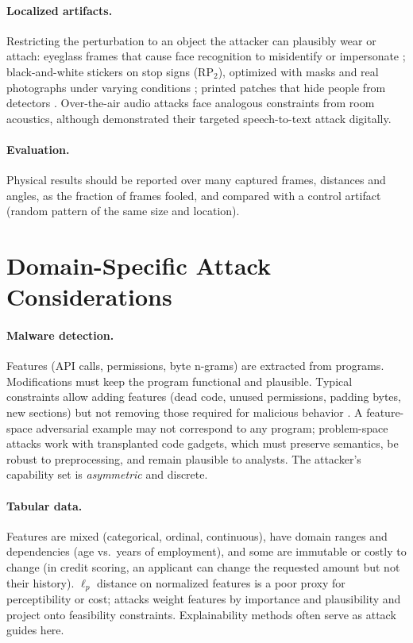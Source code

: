 \documentclass[10pt,a4paper]{extarticle}
\theoremstyle{definition}
\begin{document}
\paragraph{Localized artifacts.} Restricting the perturbation to an object the attacker can plausibly wear or attach: eyeglass frames that cause face recognition to misidentify or impersonate \citep{sharif2016accessorize}; black-and-white stickers on stop signs (RP\(_2\)), optimized with masks and real photographs under varying conditions \citep{eykholt2018robust}; printed patches that hide people from detectors \citep{thys2019fooling}. Over-the-air audio attacks face analogous constraints from room acoustics, although \citet{carlini2018audio} demonstrated their targeted speech-to-text attack digitally.

\paragraph{Evaluation.} Physical results should be reported over many captured frames, distances and angles, as the fraction of frames fooled, and compared with a control artifact (random pattern of the same size and location).

\section{Domain-Specific Attack Considerations}

\paragraph{Malware detection.} Features (API calls, permissions, byte n-grams) are extracted from programs. Modifications must keep the program functional and plausible. Typical constraints allow adding features (dead code, unused permissions, padding bytes, new sections) but not removing those required for malicious behavior \citep{grosse2017malware}. A feature-space adversarial example may not correspond to any program; problem-space attacks \citep{pierazzi2020problemspace} work with transplanted code gadgets, which must preserve semantics, be robust to preprocessing, and remain plausible to analysts. The attacker's capability set is \emph{asymmetric} and discrete.

\paragraph{Tabular data.} Features are mixed (categorical, ordinal, continuous), have domain ranges and dependencies (age vs.\ years of employment), and some are immutable or costly to change (in credit scoring, an applicant can change the requested amount but not their history). \(\ell_p\) distance on normalized features is a poor proxy for perceptibility or cost; attacks weight features by importance and plausibility \citep{ballet2019imperceptible} and project onto feasibility constraints. Explainability methods often serve as attack guides here.
\end{document}
